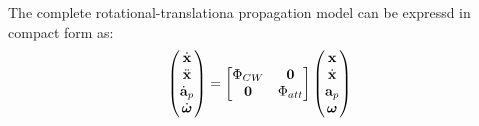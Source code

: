 The complete rotational-translationa propagation model can be expressd in compact form as:
\begin{equation} 
    \begin{pmatrix}
    \dot{\mathrm{\textbf{x}}} \\  \ddot{\mathrm{\textbf{x}}} \\  \dot{\mathrm{\textbf{a}}}_p \\ \dot{\boldsymbol{\omega}}\end{pmatrix} = \begin{bmatrix}
        \Phi_{CW} & \mathrm{\textbf{0}} \\ \mathrm{\textbf{0}} & \Phi_{att}
    \end{bmatrix}\begin{pmatrix}
    \mathrm{\textbf{x}}\\  \dot{\mathrm{\textbf{x}}} \\  \mathrm{\textbf{a}}_p \\ \boldsymbol{\omega}\end{pmatrix}
\end{equation}


